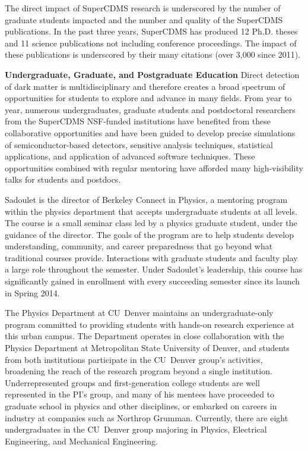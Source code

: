 The direct impact of SuperCDMS research is underscored by the number of graduate students impacted and the number and quality of the SuperCDMS publications. In the past three years, SuperCDMS has produced 12 Ph.D. theses and 11 science publications not including conference proceedings. The impact of these publications is underscored by their many citations (over 3,000 since 2011).

\textbf{Undergraduate, Graduate, and Postgraduate Education}
Direct detection of dark matter is multidisciplinary and therefore creates a broad spectrum of opportunities for students to explore and advance in many fields. From year to year, numerous undergraduates, graduate students and postdoctoral researchers from the SuperCDMS NSF-funded institutions have benefited from these collaborative opportunities and have been guided to develop precise simulations of semiconductor-based detectors, sensitive analysis techniques, statistical applications, and application of advanced software techniques. These opportunities combined with regular mentoring have afforded many high-visibility talks for students and postdocs. 


Sadoulet is the director of Berkeley Connect in Physics, a mentoring program within the physics department that accepts undergraduate students at all levels. The course is a small seminar class led by a physics graduate student, under the guidance of the director. The goals of the program are to help students develop understanding, community, and career preparedness that go beyond what traditional courses provide. Interactions with graduate students and faculty play a large role throughout the semester. Under Sadoulet’s leadership, this course has significantly gained in enrollment with every succeeding semester since its launch in Spring 2014. %

The Physics Department at CU~Denver maintains an undergraduate-only program committed to providing students with hands-on research experience at this urban campus. The Department operates in close collaboration with the Physics Department at Metropolitan State University of Denver, and students from both institutions participate in the CU~Denver group’s activities, broadening the reach of the research program beyond a single institution. Underrepresented groups and first-generation college students are well represented in the PI’s group, and many of his mentees have proceeded to graduate school in physics and other disciplines, or embarked on careers in industry at companies such as Northrop Grumman. Currently, there are eight undergraduates in the CU~Denver group majoring in Physics, Electrical Engineering, and Mechanical Engineering.  



